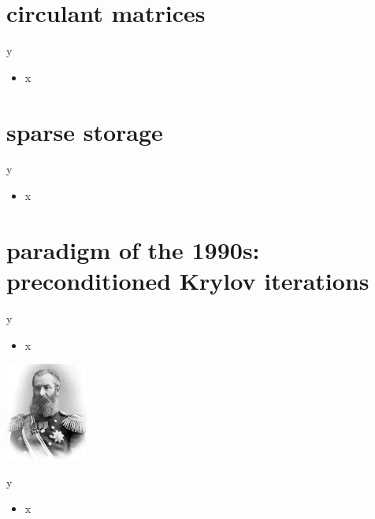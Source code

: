 \documentclass[10pt,
               svgnames,
               hyperref={colorlinks,citecolor=DeepPink4,linkcolor=FireBrick,urlcolor=Maroon},
               usepdftitle=false]{beamer}
\begin{document}
\section{circulant matrices}

\begin{frame}{y}

\begin{itemize}
\item x
\end{itemize}
\end{frame}


\section{sparse storage}

\begin{frame}{y}

\begin{itemize}
\item x
\end{itemize}
\end{frame}


\section{paradigm of the 1990s: preconditioned Krylov iterations}

\begin{frame}{y}

\begin{itemize}
\item x
\end{itemize}

\hfill \includegraphics[width=0.2\textwidth]{images/akrylov.jpg}
\end{frame}


\begin{frame}{y}

\begin{itemize}
\item x
\end{itemize}
\end{frame}
\end{document}
